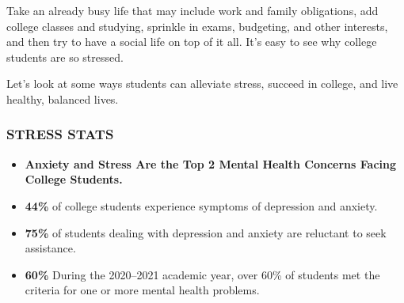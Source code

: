 \documentclass[a4paper,12pt]{article}
\begin{document}
Take an already busy life that may include work and family obligations, add college classes and studying, sprinkle in exams, budgeting, and other interests, and then try to have a social life on top of it all. It's easy to see why college students are so stressed.

Let's look at some ways students can alleviate stress, succeed in college, and live healthy, balanced lives.

\subsubsection*{STRESS STATS}
\begin{itemize}
    \item \textbf{Anxiety and Stress Are the Top 2 Mental Health Concerns Facing College Students.}
    \item \textbf{44\%} of college students experience symptoms of depression and anxiety.
    \item \textbf{75\%} of students dealing with depression and anxiety are reluctant to seek assistance.
    \item \textbf{60\%} During the 2020–2021 academic year, over 60\% of students met the criteria for one or more mental health problems.
\end{itemize}
\end{document}
